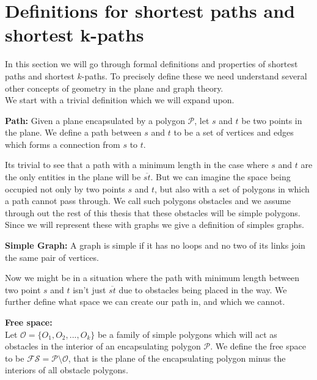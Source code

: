 \section{Definitions for shortest paths and shortest k-paths}

In this section we will go through formal definitions and properties of
shortest paths and shortest $k$-paths. To precisely define these we need
understand several other concepts of geometry in the plane and graph theory. \\

We start with a trivial definition which we will expand upon.

\begin{mydef}\textbf{Path:}
Given a plane encapsulated by a polygon $\mathcal{P}$, let $s$ and $t$ be two
	points in the plane. We define a path between $s$ and $t$ to be a set of
	vertices and edges which forms a connection from $s$ to $t$.
\end{mydef}

Its trivial to see that a path with a minimum length in the case where $s$ and $t$
are the only entities in the plane will be $\overline{st}$. But we can imagine the
space being occupied not only by two points $s$ and $t$, but also with a set of 
polygons in which a path cannot pass through. We call such polygons obstacles and
we assume through out the rest of this thesis that these obstacles will be 
simple polygons. Since we will represent these with graphs we give a definition of 
simples graphs.

\begin{mydef}\textbf{Simple Graph:}
  A graph is simple if it has no loops and no two of its links join the same pair
  of vertices.
\end{mydef}

Now we might be in a situation where the path with minimum length between two point 
$s$ and $t$ isn't just $\overline{st}$ due to obstacles being placed in the way. We 
further define what space we can create our path in, and which we cannot.

\begin{mydef} 
	\textbf{Free space:}\\ 
	Let $\mathcal{O}=\{O_1,O_2,...,O_k\}$ be a
	family of simple polygons which will act as obstacles in the interior of an
	encapsulating polygon $\mathcal{P}$. We define the free space to be
	$\mathcal{FS}=\mathcal{P}\setminus\mathcal{O}$, that is the plane of the
	encapsulating polygon minus the interiors of all obstacle polygons.
\end{mydef}

